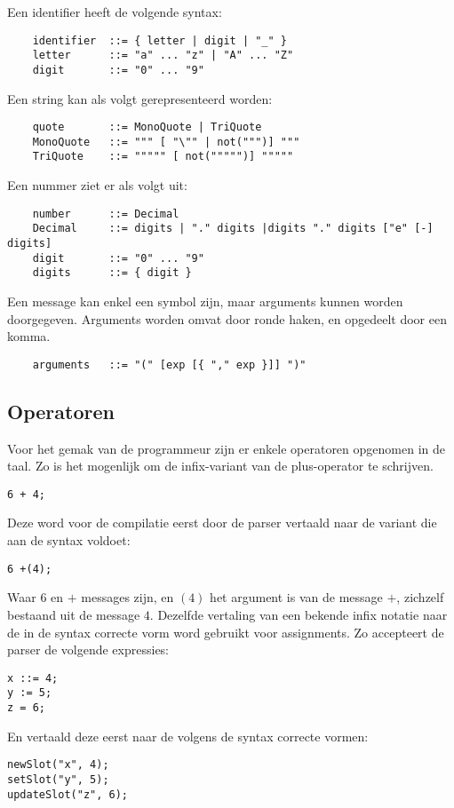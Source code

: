 \documentclass[12pt]{article}
\begin{document}
Een identifier heeft de volgende syntax:
\begin{lstlisting}
	identifier 	::= { letter | digit | "_" }
	letter 		::= "a" ... "z" | "A" ... "Z"
	digit 		::= "0" ... "9"
\end{lstlisting}

Een string kan als volgt gerepresenteerd worden:
\begin{lstlisting}
	quote 		::= MonoQuote | TriQuote
	MonoQuote 	::= """ [ "\"" | not(""")] """
	TriQuote 	::= """"" [ not(""""")] """""
\end{lstlisting}
Een nummer ziet er als volgt uit:
\begin{lstlisting}
	number    	::= Decimal
	Decimal  	::= digits | "." digits |digits "." digits ["e" [-] digits]
	digit 		::= "0" ... "9"
	digits 		::= { digit }
\end{lstlisting}

Een message kan enkel een symbol zijn, maar arguments kunnen worden doorgegeven. Arguments worden omvat door ronde haken, en opgedeelt door een komma.
\begin{lstlisting}
	arguments 	::= "(" [exp [{ "," exp }]] ")"
\end{lstlisting}
\subsection{Operatoren}
Voor het gemak van de programmeur zijn er enkele operatoren opgenomen in de taal. Zo is het mogenlijk om de infix-variant van de plus-operator te schrijven.
\begin{lstlisting}[frame=single]
6 + 4;
\end{lstlisting}
Deze word voor de compilatie eerst door de parser vertaald naar de variant die aan de syntax voldoet:
\begin{lstlisting}[frame=single]
6 +(4);
\end{lstlisting}
Waar \(6\) en \(+\) messages zijn, en \( (4) \) het argument is van de message \(+\), zichzelf bestaand uit de message \(4\). Dezelfde vertaling van een bekende infix notatie naar de in de syntax correcte vorm word gebruikt voor assignments. Zo accepteert de parser de volgende expressies:
\begin{lstlisting}[frame=single]
x ::= 4;
y := 5;
z = 6;
\end{lstlisting}
En vertaald deze eerst naar de volgens de syntax correcte vormen:
\begin{lstlisting}[frame=single]
newSlot("x", 4);
setSlot("y", 5);
updateSlot("z", 6);
\end{lstlisting}
\end{document}
